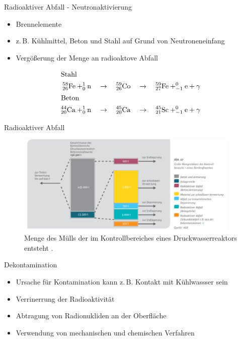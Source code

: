 \begin{frame}{Radioaktiver Abfall - Neutronaktivierung}

      \begin{itemize}
        \setlength\itemsep{1.2em}
        \item{Brennelemente}
        \item{z.\,B. Kühlmittel, Beton und Stahl auf Grund von Neutroneneinfang}
        \item{ Vergößerung der Menge an radioaktove Abfall}
      \end{itemize}
    
    \begin{align*}
        \shortintertext{Stahl}
        ^{58}_{26}\ce{Fe}+ ^1_0\mathrm{n }\quad &\rightarrow \quad  ^{59}_{26}\ce{Co} \quad \rightarrow \quad ^{59}_{27}\ce{Fe} + _{-1}^{0}\ce{e}+\gamma \\
      \shortintertext{Beton}
          ^{44}_{20}\ce{Ca}+ ^1_0\mathrm{n }\quad &\rightarrow \quad  ^{45}_{20}\ce{Ca} \quad \rightarrow \quad ^{45}_{21}\ce{Sc} + _{-1}^{0}\ce{e}+\gamma
    \end{align*}
        
\end{frame}



\begin{frame}{Radioaktiver Abfall}
  \begin{figure}
     \centering
     \includegraphics[width=0.95\textwidth]{./bilder/radioakives_material.PNG}
     \caption{Menge des Mülls der im Kontrollbereiches eines Druckwasserreaktors entsteht \cite{muell}. }
     \label{ fig: muell_kontrollbereich}
   \end{figure}
\end{frame}



\begin{frame}{Dekontamination}
  \begin{itemize}
    \setlength\itemsep{1.2em}
     \item{ Ursache für Kontamination kann z.\,B. Kontakt mit Kühlwassser sein}
    \item{ Verrinerrung der Radioaktivität}
    \item{ Abtragung von Radionukliden an der Oberfläche}
    \item{ Verwendung von mechanischen und chemischen Verfahren}
  \end{itemize}
\end{frame}

